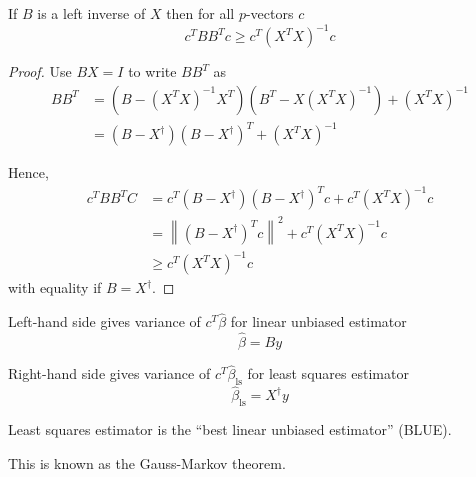 \begin{theorem}
    If $ B $ is a left inverse of $ X $ then for all $ p $-vectors $ c $
$$
c^{T} B B^{T} c \geq c^{T}\left(X^{T} X\right)^{-1} c
$$
\end{theorem}


\begin{proof}
    Use $ B X=I $ to write $ B B^{T} $ as
$$
\begin{aligned}
B B^{T} &=\left(B-\left(X^{T} X\right)^{-1} X^{T}\right)\left(B^{T}-X\left(X^{T} X\right)^{-1}\right)+\left(X^{T} X\right)^{-1} \\
&=\left(B-X^{\dagger}\right)\left(B-X^{\dagger}\right)^{T}+\left(X^{T} X\right)^{-1}
\end{aligned}
$$

Hence,
$$
\begin{aligned}
c^{T} B B^{T} C &=c^{T}\left(B-X^{\dagger}\right)\left(B-X^{\dagger}\right)^{T} c+c^{T}\left(X^{T} X\right)^{-1} c \\
&=\left\|\left(B-X^{\dagger}\right)^{T} c\right\|^{2}+c^{T}\left(X^{T} X\right)^{-1} c \\
& \geq c^{T}\left(X^{T} X\right)^{-1} c
\end{aligned}
$$
with equality if $ B=X^{\dagger} $.
\end{proof}

\begin{corollary}
    Left-hand side gives variance of $ c^{T} \hat{\beta} $ for linear unbiased estimator
$$
\hat{\beta}=B y
$$
\end{corollary}

\begin{corollary}
    Right-hand side gives variance of $ c^{T} \hat{\beta}_{\mathrm{ls}} $ for least squares estimator
$$
\hat{\beta}_{\mathrm{ls}}=X^{\dagger} y
$$
\end{corollary}

\begin{theorem}
    Least squares estimator is the ``best linear unbiased estimator'' (BLUE).
\end{theorem}

This is known as the Gauss-Markov theorem.

